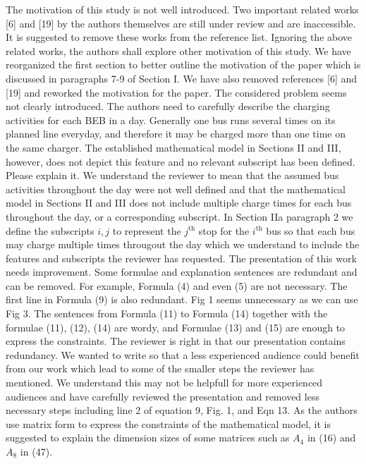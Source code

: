 \documentclass{article}
\begin{document}
\begin{buttkissing}
	\reviewerclaims The motivation of this study is not well introduced. Two important related works [6] and [19] by the authors themselves are still under review and are inaccessible. It is suggested to remove these works from the reference list. Ignoring the above related works, the authors shall explore other motivation of this study.
	\kissbutt We have reorganized the first section to better outline the motivation of the paper which is discussed in paragraphs 7-9 of Section I. We have also removed references [6] and [19] and reworked the motivation for the paper. 
	\reviewerclaims The considered problem seems not clearly introduced. The authors need to carefully describe the charging activities for each BEB in a day. Generally one bus runs several times on its planned line everyday, and therefore it may be charged more than one time on the same charger. The established mathematical model in Sections II and III, however, does not depict this feature and no relevant subscript has been defined. Please explain it.
	\kissbutt We understand the reviewer to mean that the assumed bus activities throughout the day were not well defined and that the mathematical model in Sections II and III does not include multiple charge times for each bus throughout the day, or a corresponding subscript. In Section IIa paragraph 2 we define the subscripts $i,j$ to represent the $j^{\text{th}}$ stop for the $i^{\text{th}}$ bus so that each bus may charge multiple times througout the day which we understand to include the features and subscripts the reviewer has requested.  
	\reviewerclaims The presentation of this work needs improvement. Some formulae and explanation sentences are redundant and can be removed. For example, Formula (4) and even (5) are not necessary. The first line in Formula (9) is also redundant. Fig 1 seems unnecessary as we can use Fig 3. The sentences from Formula (11) to Formula (14) together with the formulae (11), (12), (14) are wordy, and Formulae (13) and (15) are enough to express the constraints.
	\kissbutt The reviewer is right in that our presentation contains redundancy.  We wanted to write so that a less experienced audience could benefit from our work which lead to some of the smaller steps the reviewer has mentioned.  We understand this may not be helpfull for more experienced audiences and have carefully reviewed the presentation and removed less necessary steps including line 2 of equation 9, Fig. 1, and Eqn 13.  
	\reviewerclaims As the authors use matrix form to express the constraints of the mathematical model, it is suggested to explain the dimension sizes of some matrices such as $A_4$ in (16) and $A_8$ in (47).

\end{buttkissing}
\end{document}
